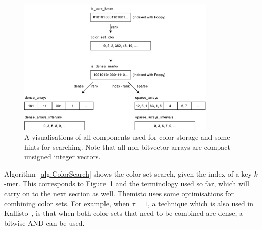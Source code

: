 \begin{figure}[t]
  \centering
  \includegraphics[width=0.85\textwidth]{images/ColorComponents.png}
  \caption{A visualisations of all components used for color storage and some hints for searching. Note that all non-bitvector arrays are compact unsigned integer vectors.}\label{fig:ColorComponents}
\end{figure}

Algorithm~\ref{alg:ColorSearch} shows the color set search, given the index of a key-$k$-mer.
This corresponds to Figure~\ref{fig:ColorComponents} and the terminology used so far, which will carry on to the next section as well.
Themisto uses some optimisations for combining color sets.
For example, when $\tau=1$, a technique which is also used in Kallisto~\cite{Kallisto}, is that when both color sets that need to be combined are dense, a bitwise AND can be used.

